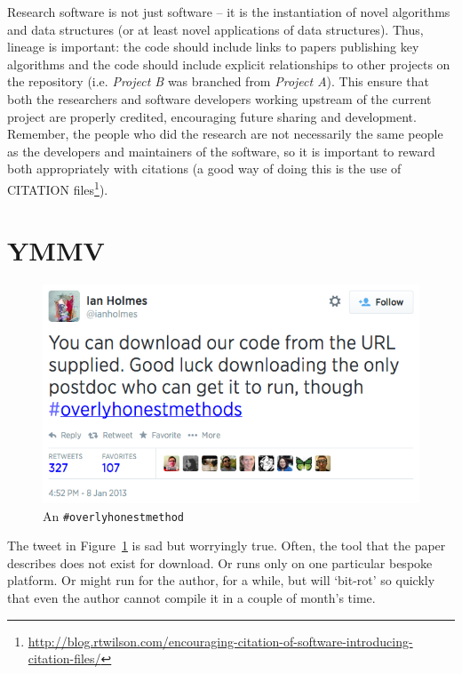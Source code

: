 \documentclass[10pt,conference,final]{IEEEtran}
\begin{document}
Research software is not just software -- it is the instantiation of
novel algorithms and data structures (or at least novel applications
of data structures). Thus, lineage is important: the code should
include links to papers publishing key algorithms and the
code should include explicit relationships to other projects on the
repository (i.e. {\emph{Project B}} was branched from {\emph{Project
A}}). This ensure that both the researchers and software developers
working upstream of the current project are properly credited,
encouraging future sharing and development. Remember, the people who
did the research are not necessarily the same people as the developers
and maintainers of the software, so it is important to reward both
appropriately with citations (a good way of doing this is the use of
CITATION
files\footnote{\url{http://blog.rtwilson.com/encouraging-citation-of-software-introducing-citation-files/}}).


\section{YMMV}

\begin{figure}[!ht]
\centering
\includegraphics[width=\columnwidth]{overlyhonesttweet.png}
\caption{An {\texttt{\#overlyhonestmethod}}}
\label{fig:overlyhonestmethod} 
\end{figure}

The tweet in Figure~\ref{fig:overlyhonestmethod} is sad but worryingly
true. Often, the tool that the paper describes does not exist for
download. Or runs only on one particular bespoke platform. Or might
run for the author, for a while, but will `bit-rot' so quickly that even
the author cannot compile it in a couple of month's time.
\end{document}
